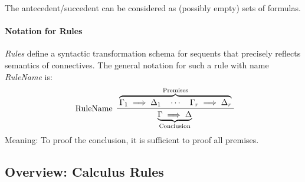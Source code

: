 			The antecedent/succedent can be considered as (possibly empty) sets of formulas.
			
		
		\paragraph{Notation for Rules}
			\textit{Rules} define a syntactic transformation schema for sequents that precisely reflects semantics of connectives. The general notation for such a rule with name \textit{RuleName} is:
			\begin{equation*}
				\prftree[l]
					{ RuleName }
					{ \overbrace{\Gamma_1 \implies \Delta_1 \quad\cdots\quad \Gamma_r \implies \Delta_r}^\textrm{Premises} }
					{ \underbrace{\Gamma \implies \Delta}_\textrm{Conclusion} }
			\end{equation*}
			Meaning: To proof the conclusion, it is sufficient to proof all premises.

		\subsection{Overview: Calculus Rules}
